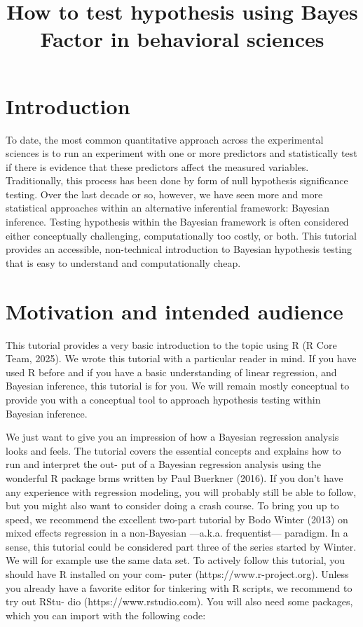 \documentclass[
  jou,
  longtable,
  nolmodern,
  notxfonts,
  notimes,
  colorlinks=true,linkcolor=blue,citecolor=blue,urlcolor=blue]{apa7}
\title{How to test hypothesis using Bayes Factor in behavioral sciences}
\begin{document}
\maketitle



\setcounter{secnumdepth}{3}

\setlength\LTleft{0pt}




\section{Introduction}\label{introduction}

To date, the most common quantitative approach across the experimental
sciences is to run an experiment with one or more predictors and
statistically test if there is evidence that these predictors affect the
measured variables. Traditionally, this process has been done by form of
null hypothesis significance testing. Over the last decade or so,
however, we have seen more and more statistical approaches within an
alternative inferential framework: Bayesian inference. Testing
hypothesis within the Bayesian framework is often considered either
conceptually challenging, computationally too costly, or both. This
tutorial provides an accessible, non-technical introduction to Bayesian
hypothesis testing that is easy to understand and computationally cheap.

\section{Motivation and intended
audience}\label{motivation-and-intended-audience}

This tutorial provides a very basic introduction to the topic using R (R
Core Team, 2025). We wrote this tutorial with a particular reader in
mind. If you have used R before and if you have a basic understanding of
linear regression, and Bayesian inference, this tutorial is for you. We
will remain mostly conceptual to provide you with a conceptual tool to
approach hypothesis testing within Bayesian inference.

We just want to give you an impression of how a Bayesian regression
analysis looks and feels. The tutorial covers the essential concepts and
explains how to run and interpret the out- put of a Bayesian regression
analysis using the wonderful R package brms written by Paul Buerkner
(2016). If you don't have any experience with regression modeling, you
will probably still be able to follow, but you might also want to
consider doing a crash course. To bring you up to speed, we recommend
the excellent two-part tutorial by Bodo Winter (2013) on mixed eﬀects
regression in a non-Bayesian ---a.k.a. frequentist--- paradigm. In a
sense, this tutorial could be considered part three of the series
started by Winter. We will for example use the same data set. To
actively follow this tutorial, you should have R installed on your com-
puter (https://www.r-project.org). Unless you already have a favorite
editor for tinkering with R scripts, we recommend to try out RStu- dio
(https://www.rstudio.com). You will also need some packages, which you
can import with the following code:
\end{document}
